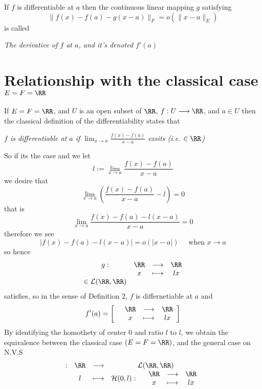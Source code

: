\begin{definition}[]
	If $f $ is differentiable 
	at $a $ then the continuous linear mapping $g $ 
	satisfying
	\[
	\| f(x) -f(a) - g(x-a)  \|_{F}  = 
	o(\| x-a \|_{E} ) 
	\]
	is called
	\begin{center}
		\it
		The derivative of $f $ at $a $, and it's 
		denoted $f'(a)  $ 
		\normalfont
	\end{center}
\end{definition}
\section{Relationship with the classical case 
	\texorpdfstring{$ E = F = \RR $}{E=F=R}
}
If $E = F = \RR $, and $U $ is an open subset of $\RR  $,
$ f : U \longrightarrow \RR $, and $a \in U $ then the classical
definition of the differentiability states that 
\begin{center}
	\it
	$f $ is differentiable at $a $ if 
	$\lim_{x \to a} \frac{f(x) -f(a) }{x-a} $  
	exsits (i.e. $ \in \RR  $)
	\normalfont
\end{center}
So if its the case and we let 
\[
l := 
\lim_{x \to a} 
\frac{f(x) - f(a)  }{ x-a}
\]
we desire that 
\[
\lim_{x \to a}
\left( 
	\frac{f(x) -f(a) }{x-a} - l
\right) = 0
\]
that is 
\[
\lim_{x \to a} 
\frac{f(x) -f(a) -l(x-a) }{x-a} = 0
\]
therefore we see
\[
\left| f(x) -f(a) -l(x-a)  \right| = o (\left| x-a \right|)  
\quad  \text{ when } x \rightarrow a
\]
so hence 
\[
\begin{array}{cccc}
      g : &  \RR   & \longrightarrow & \RR  \\
           &  x  & \longmapsto     & lx \\ 
          \in  \mathcal{L} (\RR ,\RR ) 
\end{array}
\]
satisfies, so in the sense of Definition $2$, 
$f $ is differnetiable at $a $ and 
\[
f'(a)  = 
\left[ 
	\begin{array}{cccc}
	        & \RR     & \longrightarrow &  \RR \\
	
	           &    x& \longmapsto     &  lx \\ 
	\end{array}
\right]
\]
By identifying the homothety of center
$0 $ and ratio $l$ to $l $, we obtain the equivalence
between the classical case 
$(E=F=\RR )  $, and the general case on N.V.S
\[
\begin{array}{cccc}
       : &  \RR   & \longrightarrow & 
       \mathcal{L} (\RR ,\RR ) \\

           &  l  & \longmapsto     & \mathcal{H}(0,l):
	   \begin{array}{cccc}
	             &  \RR    & \longrightarrow &  \RR  \\
	   
	              & x    & \longmapsto     &  lx \\
	   \end{array}
\end{array}
\]
